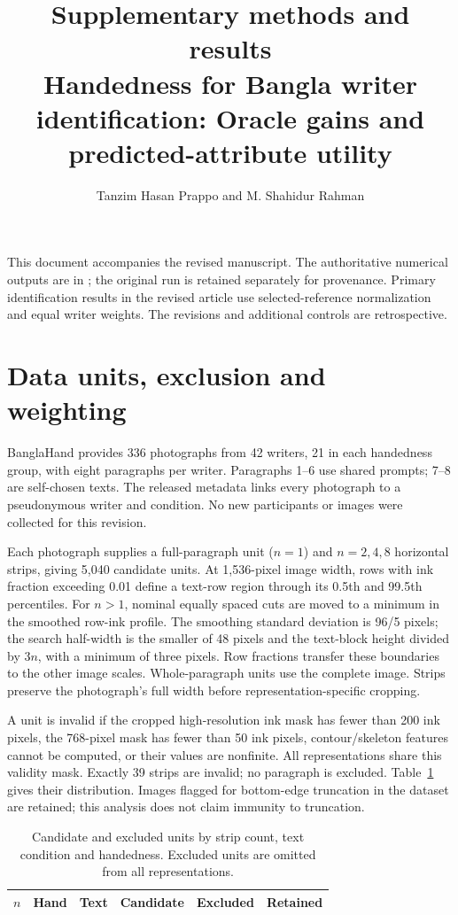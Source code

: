 \documentclass[10pt,a4paper]{article}
\title{Supplementary methods and results\\[4pt]\large Handedness for Bangla writer identification: Oracle gains and predicted-attribute utility}
\author{Tanzim Hasan Prappo and M. Shahidur Rahman}
\date{}
\begin{document}
\maketitle
\vspace{-12pt}
This document accompanies the revised manuscript. The authoritative numerical outputs are in ; the original run is retained separately for provenance. Primary identification results in the revised article use selected-reference normalization and equal writer weights. The revisions and additional controls are retrospective.

\section{Data units, exclusion and weighting}
BanglaHand provides 336 photographs from 42 writers, 21 in each handedness group, with eight paragraphs per writer. Paragraphs 1--6 use shared prompts; 7--8 are self-chosen texts. The released metadata links every photograph to a pseudonymous writer and condition. No new participants or images were collected for this revision.

Each photograph supplies a full-paragraph unit ($n=1$) and $n=2,4,8$ horizontal strips, giving 5,040 candidate units. At 1,536-pixel image width, rows with ink fraction exceeding 0.01 define a text-row region through its 0.5th and 99.5th percentiles. For $n>1$, nominal equally spaced cuts are moved to a minimum in the smoothed row-ink profile. The smoothing standard deviation is 96/5 pixels; the search half-width is the smaller of 48 pixels and the text-block height divided by $3n$, with a minimum of three pixels. Row fractions transfer these boundaries to the other image scales. Whole-paragraph units use the complete image. Strips preserve the photograph's full width before representation-specific cropping.

A unit is invalid if the cropped high-resolution ink mask has fewer than 200 ink pixels, the 768-pixel mask has fewer than 50 ink pixels, contour/skeleton features cannot be computed, or their values are nonfinite. All representations share this validity mask. Exactly 39 strips are invalid; no paragraph is excluded. Table~\ref{tab:exclusions} gives their distribution. Images flagged for bottom-edge truncation in the dataset are retained; this analysis does not claim immunity to truncation.

\begin{table}[ht]
\centering\small
\caption{Candidate and excluded units by strip count, text condition and handedness. Excluded units are omitted from all representations.}\label{tab:exclusions}
\begin{tabular}{rrlrrr}\toprule
$n$ & Hand & Text & Candidate & Excluded & Retained\\\midrule

\end{tabular}
\end{table}
\end{document}
